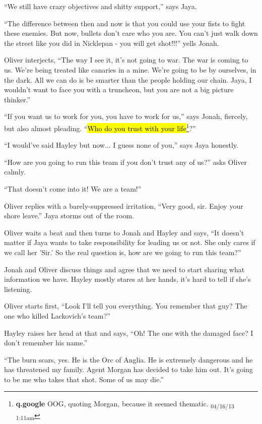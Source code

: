 ``We still have crazy objectives and shitty support,'' says Jaya.

``The difference between then and now is that you could use your fists to fight these enemies.  But now, bullets don't care who you are.  You can't just walk down the street like you did in Nicklepan - you will get shot!!!'' yells Jonah.

Oliver interjects, ``The way I see it, it's not going to war.  The war is coming to us.  We're being treated like canaries in a mine.  We're going to be by ourselves, in the dark.  All we can do is be smarter than the people holding our chain.  Jaya, I wouldn't want to face you with a truncheon, but you are not a big picture thinker.''

``If you want us to work for you, you have to work for us,'' says Jonah, fiercely, but also almost pleading.  ``\hl{Who do you trust with your life}\footnote{\textbf{q.google }OOG, quoting Morgan, because it seemed thematic. \textsubscript{04/16/13 1:11am}}?''

``I would've said Hayley but now... I guess none of you,'' says Jaya honestly.

``How are you going to run this team if you don't trust any of us?'' asks Oliver calmly.

``That doesn't come into it!  We are a team!''

Oliver replies with a barely-suppressed irritation, ``Very good, sir.  Enjoy your shore leave.'' Jaya storms out of the room.



Oliver waits a beat and then turns to Jonah and Hayley and says, ``It doesn't matter if Jaya wants to take responsibility for leading us or not. She only cares if we call her 'Sir.' So the real question is, how are we going to run this team?''

Jonah and Oliver discuss things and agree that we need to start sharing what information we have.  Hayley mostly stares at her hands, it's hard to tell if she's listening.

Oliver starts first, ``Look I'll tell you everything.  You remember that guy? The one who killed Lackovich's team?''

Hayley raises her head at that and says, ``Oh!  The one with the damaged face?  I don't remember his name.''

``The burn scars, yes.  He is the Orc of Anglia.  He is extremely dangerous and he has threatened my family.  Agent Morgan has decided to take him out.  It's going to be me who takes that shot.  Some of us may die.''

